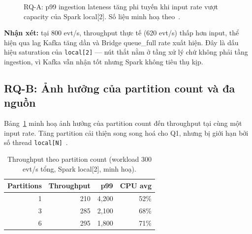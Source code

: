 \begin{figure}[H]
\centering
{}
\caption[RQ-A: p99 ingestion lateness theo input rate.]{RQ-A: p99 ingestion lateness tăng phi tuyến khi input rate vượt
capacity của Spark local{[}2{]}. Số liệu minh hoạ
theo~\cite{kafka_patterns_benchmark_2025, shufflebench_2024}.}
\label{fig:rq-a}
\end{figure}

\textbf{Nhận xét:} tại 800 evt/s, throughput thực tế (620 evt/s) thấp hơn
input, thể hiện qua lag Kafka tăng dần và Bridge queue\_full rate xuất hiện.
Đây là dấu hiệu saturation của \texttt{local[2]} --- nút thắt nằm ở tầng xử
lý chứ không phải tầng ingestion, vì Kafka vẫn nhận tốt nhưng Spark không
tiêu thụ kịp.

\subsection{RQ-B: Ảnh hưởng của partition count và đa nguồn}

Bảng~\ref{tab:rq-b} minh hoạ ảnh hưởng của partition count đến throughput
tại cùng một input rate. Tăng partition cải thiện song song hoá cho Q1, nhưng
bị giới hạn bởi số thread \texttt{local[N]}~\cite{kafka_patterns_benchmark_2025,
confluent_partition_count}.

\begin{table}[H]
\centering
\caption{Throughput theo partition count (workload 300 evt/s tổng, Spark local{[}2{]}, minh hoạ).}
\label{tab:rq-b}
\begin{tabular}{rrrr}
\toprule
\textbf{Partitions} & \textbf{Throughput} & \textbf{p99} & \textbf{CPU avg} \\
\midrule
1  & 210 & 4,200 & 52\% \\
3  & 285 & 2,100 & 68\% \\
6  & 295 & 1,800 & 71\% \\
\bottomrule
\end{tabular}
\end{table}

